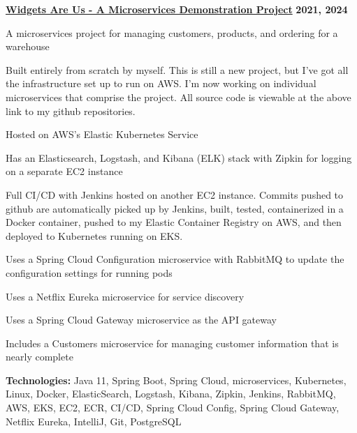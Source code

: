 %
    \headerrow
        {\textbf{\href{https://github.com/johatfie/widgets-are-us}{Widgets Are Us - A Microservices Demonstration Project}}}
        {\textbf{2021, 2024}}
    \begin{itemize*}
        \item A microservices project for managing customers, products, and ordering for a warehouse
        \item Built entirely from scratch by myself.  This is still a new project, but I've got all the infrastructure set up to run
            on AWS.  I'm now working on individual microservices that comprise the project.  All source code is viewable
            at the above link to my github repositories.
        \item Hosted on AWS's Elastic Kubernetes Service
        \item Has an Elasticsearch, Logstash, and Kibana (ELK) stack with Zipkin for logging on a separate EC2 instance
        \item Full CI/CD with Jenkins hosted on another EC2 instance.  Commits pushed to github are automatically picked up by
            Jenkins, built, tested, containerized in a Docker container, pushed to my Elastic Container Registry on AWS, and then
            deployed to Kubernetes running on EKS.
        \item Uses a Spring Cloud Configuration microservice with RabbitMQ to update the configuration settings for running pods
        \item Uses a Netflix Eureka microservice for service discovery
        \item Uses a Spring Cloud Gateway microservice as the API gateway
        \item Includes a Customers microservice for managing customer information that is nearly complete
    \end{itemize*}

    \hspace{1.0em}
        {\textbf{Technologies:} Java 11, Spring Boot, Spring Cloud, microservices, Kubernetes, Linux, Docker, ElasticSearch,
        Logstash, Kibana, Zipkin, Jenkins, RabbitMQ, AWS, EKS, EC2, ECR, CI/CD, Spring Cloud Config, Spring Cloud Gateway,
        Netflix Eureka, IntelliJ, Git, PostgreSQL}

